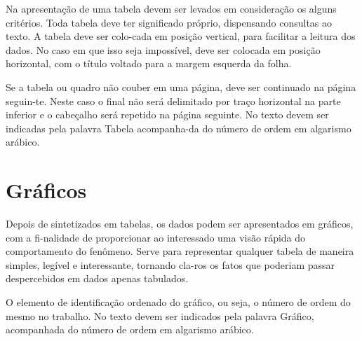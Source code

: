 Na apresentação de uma tabela devem ser levados em consideração
os alguns critérios. Toda tabela deve ter significado próprio, dispensando consultas ao texto. A tabela deve ser colo-cada em posição vertical, para facilitar a leitura dos dados. No caso em que isso seja impossível, deve ser colocada em posição horizontal, com o título voltado para a margem esquerda da folha.

Se a tabela ou quadro não couber em uma página, deve ser
continuado na página seguin-te. Neste caso o final não será delimitado por traço horizontal na parte inferior e o cabeçalho será repetido na página seguinte. No texto devem ser indicadas pela palavra Tabela acompanha-da do número de ordem em algarismo arábico.



\section{Gráficos}

Depois de sintetizados em tabelas, os dados podem ser
apresentados em gráficos, com a fi-nalidade de proporcionar ao interessado uma visão rápida do comportamento do fenômeno. Serve para representar qualquer tabela de maneira simples, legível e interessante, tornando cla-ros os fatos que poderiam passar despercebidos em dados apenas tabulados.

O elemento de identificação ordenado do gráfico, ou seja, o
número de ordem do mesmo no trabalho. No texto devem ser indicados pela palavra Gráfico, acompanhada do número de ordem em algarismo arábico.